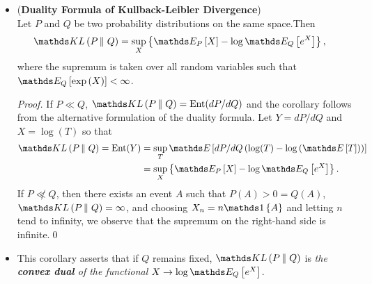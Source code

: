 \documentclass[11pt]{article}
\begin{document}
\begin{itemize}
\item \begin{corollary}  (\textbf{Duality Formula of Kullback-Leibler Divergence}) \citep{thomas2006elements, boucheron2013concentration}\\
Let $P$ and $Q$ be two probability distributions on the same space.Then
\begin{align}
\kl{P}{Q} &= \sup_{X}\set{\E{P}{X} - \log \E{Q}{e^{X}} }, \label{eqn: duality_kl_divg}
\end{align} where the supremum is taken over all random variables such that $\E{Q}{\exp\paren{X}} < \infty$.
\end{corollary}
\begin{proof}
If $P \ll Q$, $\kl{P}{Q} = \text{Ent}(dP/dQ)$ and the corollary follows from the alternative formulation of the duality formula. Let $Y=dP/dQ$ and $X = \log(T)$ so that 
\begin{align*}
\kl{P}{Q} = \text{Ent}(Y) &= \sup_{T}\E{}{dP/dQ\paren{\log(T) - \log\paren{\E{}{T}}}} \\
&= \sup_{X}\set{\E{P}{X} - \log\E{Q}{e^{X}} }.
\end{align*}
If $P \not\ll Q$, then there exists an event $A$ such that $P(A) > 0 = Q(A)$, $\kl{P}{Q} = \infty$, and choosing $X_n = n\ind{A}$ and letting $n$ tend to infinity, we observe that the supremum on the right-hand side is infinite.\qed
\end{proof}

\item \begin{remark}
This corollary asserts that if $Q$ remains fixed, $\kl{P}{Q} $ is \emph{the \textbf{convex dual} of the functional}
$X \to \log\E{Q}{e^X}$.
\end{remark}


\end{itemize}
\end{document}
